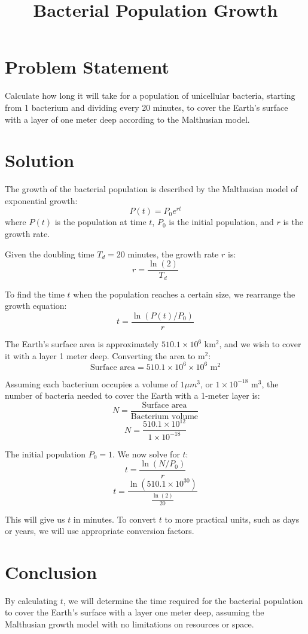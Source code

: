\documentclass{article}
\begin{document}
\title{Bacterial Population Growth}
\date{}
\maketitle

\section*{Problem Statement}
Calculate how long it will take for a population of unicellular bacteria, starting from 1 bacterium and dividing every 20 minutes, to cover the Earth's surface with a layer of one meter deep according to the Malthusian model.

\section*{Solution}
The growth of the bacterial population is described by the Malthusian model of exponential growth:
\[ P(t) = P_0 e^{rt} \]
where \( P(t) \) is the population at time \( t \), \( P_0 \) is the initial population, and \( r \) is the growth rate.

Given the doubling time \( T_d = 20 \) minutes, the growth rate \( r \) is:
\[ r = \frac{\ln(2)}{T_d} \]

To find the time \( t \) when the population reaches a certain size, we rearrange the growth equation:
\[ t = \frac{\ln(P(t) / P_0)}{r} \]

The Earth's surface area is approximately \( 510.1 \times 10^6 \) km\(^2\), and we wish to cover it with a layer 1 meter deep. Converting the area to m\(^2\):
\[ \text{Surface area} = 510.1 \times 10^6 \times 10^6 \text{ m}^2 \]

Assuming each bacterium occupies a volume of \( 1 \mu m^3 \), or \( 1 \times 10^{-18} \text{ m}^3 \), the number of bacteria needed to cover the Earth with a 1-meter layer is:
\[ N = \frac{\text{Surface area}}{\text{Bacterium volume}} \]
\[ N = \frac{510.1 \times 10^{12}}{1 \times 10^{-18}} \]

The initial population \( P_0 = 1 \). We now solve for \( t \):
\[ t = \frac{\ln(N / P_0)}{r} \]
\[ t = \frac{\ln(510.1 \times 10^{30})}{\frac{\ln(2)}{20}} \]

This will give us \( t \) in minutes. To convert \( t \) to more practical units, such as days or years, we will use appropriate conversion factors.

\section*{Conclusion}
By calculating \( t \), we will determine the time required for the bacterial population to cover the Earth's surface with a layer one meter deep, assuming the Malthusian growth model with no limitations on resources or space.
\end{document}
